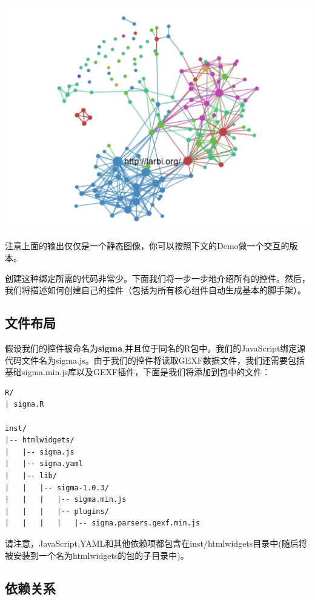 \documentclass[]{book}
\theoremstyle{definition}
\theoremstyle{definition}
\theoremstyle{definition}
\theoremstyle{remark}
\begin{document}
\begin{center}\includegraphics[width=6.89in]{pic/ch1_1} \end{center}

注意上面的输出仅仅是一个静态图像，你可以按照下文的Demo做一个交互的版本。

创建这种绑定所需的代码非常少。下面我们将一步一步地介绍所有的控件。然后，我们将描述如何创建自己的控件（包括为所有核心组件自动生成基本的脚手架）。

\subsection{文件布局}

假设我们的控件被命名为\textbf{sigma},并且位于同名的R包中。我们的JavaScript绑定源代码文件名为sigma.js。由于我们的控件将读取GEXF数据文件，我们还需要包括基础sigma.min.js库以及GEXF插件，下面是我们将添加到包中的文件：

\begin{verbatim}
R/
| sigma.R

inst/
|-- htmlwidgets/
|   |-- sigma.js
|   |-- sigma.yaml
|   |-- lib/
|   |   |-- sigma-1.0.3/
|   |   |   |-- sigma.min.js
|   |   |   |-- plugins/
|   |   |   |   |-- sigma.parsers.gexf.min.js
\end{verbatim}

请注意，JavaScript,YAML和其他依赖项都包含在inst/htmlwidgets目录中(随后将被安装到一个名为htmlwidgets的包的子目录中)。

\subsection{依赖关系}
\end{document}
